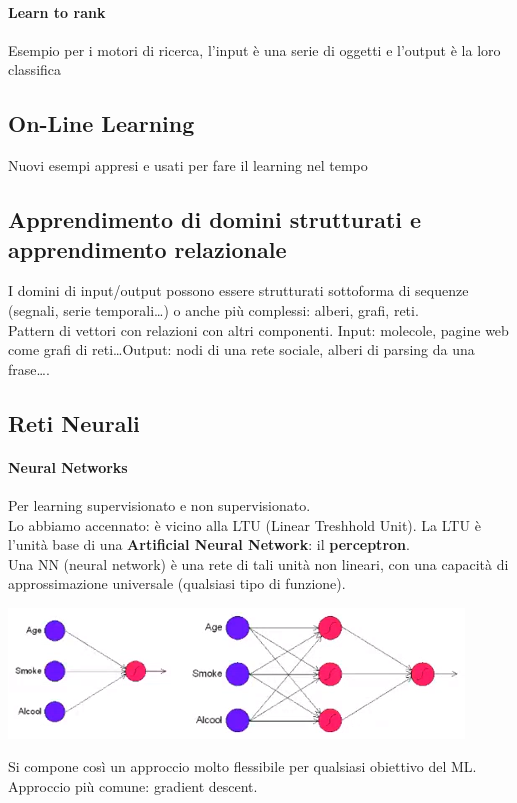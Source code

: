 \documentclass[10pt]{book}
\begin{document}
\paragraph{Learn to rank} Esempio per i motori di ricerca, l'input è una serie di oggetti e l'output è la loro classifica
\subsection{On-Line Learning} Nuovi esempi appresi e usati per fare il learning nel tempo
\subsection{Apprendimento di domini strutturati e apprendimento relazionale}
I domini di input/output  possono essere strutturati sottoforma di sequenze (segnali, serie temporali\ldots) o anche più complessi: alberi, grafi, reti.\\
Pattern di vettori con relazioni con altri componenti. Input: molecole, pagine web come grafi di reti\ldots Output: nodi di una rete sociale, alberi di parsing da una frase\ldots.
\subsection{Reti Neurali}
\paragraph{Neural Networks} Per learning supervisionato e non supervisionato.\\
Lo abbiamo accennato: è vicino alla LTU (Linear Treshhold Unit). La LTU è l'unità base di una \textbf{Artificial Neural Network}: il \textbf{perceptron}.\\
Una NN (neural network) è una rete di tali unità non lineari, con una capacità di approssimazione universale (qualsiasi tipo di funzione).
\begin{center}
	\includegraphics[scale=1]{nn.png}
\end{center}
Si compone così un approccio molto flessibile per qualsiasi obiettivo del ML. Approccio più comune: gradient descent.
\end{document}
